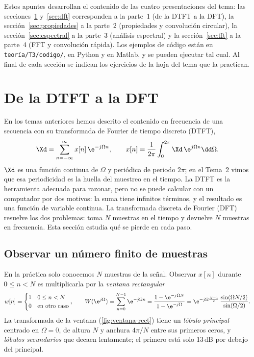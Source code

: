 \documentclass[11pt,a4paper]{scrartcl}
\begin{document}

\begin{nota}
  Estos apuntes desarrollan el contenido de las cuatro presentaciones del tema: las secciones~\ref{sec:dtft} y~\ref{sec:dft} corresponden a la parte~1 (de la DTFT a la DFT), la sección~\ref{sec:propiedades} a la parte~2 (propiedades y convolución circular), la sección~\ref{sec:espectral} a la parte~3 (análisis espectral) y la sección~\ref{sec:fft} a la parte~4 (FFT y convolución rápida). Los ejemplos de código están en \texttt{teoría/T3/codigo/}, en Python y en Matlab, y se pueden ejecutar tal cual. Al final de cada sección se indican los ejercicios de la hoja del tema que la practican.
\end{nota}

\tableofcontents

\section{De la DTFT a la DFT}\label{sec:dtft}

En los temas anteriores hemos descrito el contenido en frecuencia de una secuencia con su transformada de Fourier de tiempo discreto (DTFT),
\[
  \Xd=\sum_{n=-\infty}^{\infty}x[n]\,\e^{-j\Omega n},\qquad x[n]=\frac1{2\pi}\int_0^{2\pi}\Xd\,\e^{j\Omega n}\dd\Omega.
\]
$\Xd$ es una función continua de $\Omega$ y periódica de periodo $2\pi$; en el Tema~2 vimos que esa periodicidad es la huella del muestreo en el tiempo. La DTFT es la herramienta adecuada para razonar, pero no se puede calcular con un computador por dos motivos: la suma tiene infinitos términos, y el resultado es una función de variable continua. La transformada discreta de Fourier (DFT) resuelve los dos problemas: toma $N$ muestras en el tiempo y devuelve $N$ muestras en frecuencia. Esta sección estudia qué se pierde en cada paso.

\subsection{Observar un número finito de muestras}

En la práctica solo conocemos $N$ muestras de la señal. Observar $x[n]$ durante $0\le n<N$ es multiplicarla por la \emph{ventana rectangular}
\[
  w[n]=\begin{cases}1 & 0\le n<N\\0&\text{en otro caso}\end{cases},\qquad
  W(\e^{j\Omega})=\sum_{n=0}^{N-1}\e^{-j\Omega n}=\frac{1-\e^{-j\Omega N}}{1-\e^{-j\Omega}}=\e^{-j\Omega\frac{N-1}2}\,\frac{\sin(\Omega N/2)}{\sin(\Omega/2)}.
\]
La transformada de la ventana (\cref{fig:ventana-rect}) tiene un \emph{lóbulo principal} centrado en $\Omega=0$, de altura $N$ y anchura $4\pi/N$ entre sus primeros ceros, y \emph{lóbulos secundarios} que decaen lentamente; el primero está solo 13\,dB por debajo del principal.
\end{document}
